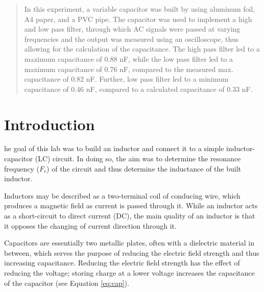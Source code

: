 \documentclass[journal]{IEEEtran}
\begin{document}
\begin{abstract}
In this experiment, a variable capacitor was built by using aluminum foil, A4 paper, and a PVC pipe. The capacitor was used to implement a high and low pass filter, through which AC signals were passed at varying frequencies and the output was measured using an oscilloscope, thus allowing for the calculation of the capacitance. The high pass filter led to a maximum capacitance of 0.88 nF, while the low pass filter led to a maximum capacitance of 0.76 nF, compared to the measured max. capacitance of 0.82 nF. Further, low pass filter led to a minimum capacitance of 0.46 nF, compared to a calculated capacitance of 0.33 nF.
\end{abstract}










\section{Introduction}

\lowercase{he} goal of this lab was to build an inductor and connect it to a simple inductor-capacitor (LC) circuit. In doing so, the aim was to determine the resonance frequency ($F_{r}$) of the circuit and thus determine the inductance of the built inductor.

\noindnet Inductors may be described as a two-terminal coil of conducing wire, which produces a magnetic field as current is passed through it. While an inductor acts as a short-circuit to direct current (DC), the main quality of an inductor is that it opposes the changing of current direction through it. 



\noindent Capacitors are essentially two metallic plates, often with a dielectric material in between, which serves the purpose of reducing the electric field strength and thus increasing capacitance. Reducing the electric field strength has the effect of reducing the voltage; storing charge at a lower voltage increases the capacitance of the capacitor (see Equation \ref{eq:cap}).
\end{document}

